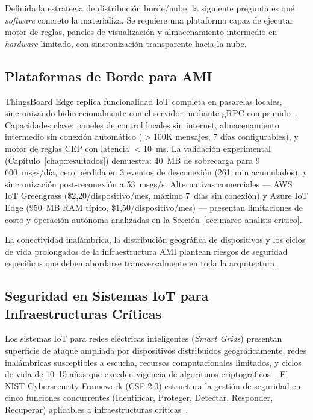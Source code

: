 Definida la estrategia de distribución borde/nube, la siguiente pregunta es qué \emph{software} concreto la materializa. Se requiere una plataforma capaz de ejecutar motor de reglas, paneles de visualización y almacenamiento intermedio en \emph{hardware} limitado, con sincronización transparente hacia la nube.

\subsection{Plataformas de Borde para AMI}
\label{sec:marco-estado-edge}

ThingsBoard Edge replica funcionalidad IoT completa en pasarelas locales, sincronizando bidireccionalmente con el servidor mediante gRPC comprimido~\cite{thingsboardEdgeArchitecture2024}. Capacidades clave: paneles de control locales sin internet, almacenamiento intermedio sin conexión automático ($>$100K mensajes, 7 días configurables), y motor de reglas CEP con latencia $<$10~ms. La validación experimental (Capítulo~\ref{chap:resultados}) demuestra: 40~MB de sobrecarga para 9\,600~msgs/día, cero pérdida en 3 eventos de desconexión (261~min acumulados), y sincronización post-reconexión a 53~msgs/s. Alternativas comerciales --- AWS IoT Greengrass (\$2,20/dispositivo/mes, máximo 7~días sin conexión) y Azure IoT Edge (950~MB RAM típico, \$1,50/dispositivo/mes) --- presentan limitaciones de costo y operación autónoma analizadas en la Sección~\ref{sec:marco-analisis-critico}.

La conectividad inalámbrica, la distribución geográfica de dispositivos y los ciclos de vida prolongados de la infraestructura AMI plantean riesgos de seguridad específicos que deben abordarse transversalmente en toda la arquitectura.

\subsection{Seguridad en Sistemas IoT para Infraestructuras Críticas}
\label{sec:marco-seguridad}

Los sistemas IoT para redes eléctricas inteligentes (\emph{Smart Grids}) presentan superficie de ataque ampliada por dispositivos distribuidos geográficamente, redes inalámbricas susceptibles a escucha, recursos computacionales limitados, y ciclos de vida de 10--15 años que exceden vigencia de algoritmos criptográficos~\cite{BlockchainBasedSecureAuthentication2025,nandalSECURITYRISKSIoT2025}. El NIST Cybersecurity Framework (CSF 2.0) estructura la gestión de seguridad en cinco funciones concurrentes (Identificar, Proteger, Detectar, Responder, Recuperar) aplicables a infraestructuras críticas~\cite{alsuwaidiSecuringSmartGrid2024}.


